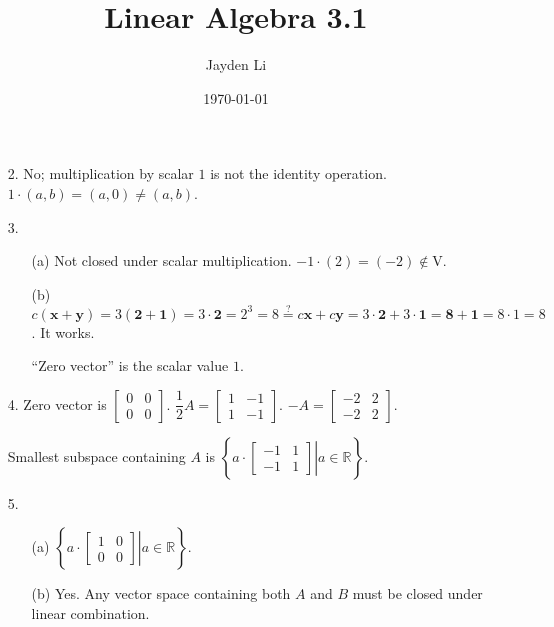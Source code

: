 \documentclass{article}
\title{\vspace*{-30pt}Linear Algebra 3.1}
\author{Jayden Li}
\date{\today}
\begin{document}
\fontsize{12pt}{12pt}\selectfont
\setlength{\abovedisplayskip}{0pt}
\maketitle
\begin{enumerate}
	\item[2.] No; multiplication by scalar $1$ is not the identity operation. $1\cdot(a,b)=(a,0)\neq(a,b)$.
	\item[3.] \begin{itemize}
		\item[(a)] Not closed under scalar multiplication. $-1\cdot(2)=(-2)\not\in\mathrm V$.
		\item[(b)]
			$c(\mathbf x+\mathbf y)=3(\mathbf 2+\mathbf 1)=3\cdot\mathbf2=2^3=8\overset?=c\mathbf x+c\mathbf y=3\cdot\mathbf 2+3\cdot\mathbf 1=\mathbf8+\mathbf1=8\cdot1=8$. It works.

			``Zero vector'' is the scalar value $1$.
	\end{itemize}
	\item[4.]
		Zero vector is $\begin{bmatrix}
			0 & 0 \\
			0 & 0
		\end{bmatrix}$.
		$\dfrac12A=\begin{bmatrix}
			1 & -1 \\
			1 & -1
		\end{bmatrix}$.
		$-A=\begin{bmatrix}
			-2 & 2 \\
			-2 & 2
		\end{bmatrix}$.

		Smallest subspace containing $A$ is
		$\left\{\left.a\cdot\begin{bmatrix}
			-1 & 1 \\
			-1 & 1
		\end{bmatrix}\right|a\in\mathbb R\right\}$.
	\item[5.]
		\begin{itemize}
			\item[(a)]
				$\left\{\left.a\cdot\begin{bmatrix}
					1 & 0 \\
					0 & 0
				\end{bmatrix}\right|a\in\mathbb R\right\}$.

			\item[(b)]
				Yes. Any vector space containing both $A$ and $B$ must be closed under linear combination.


\end{itemize}
\end{enumerate}
\end{document}
